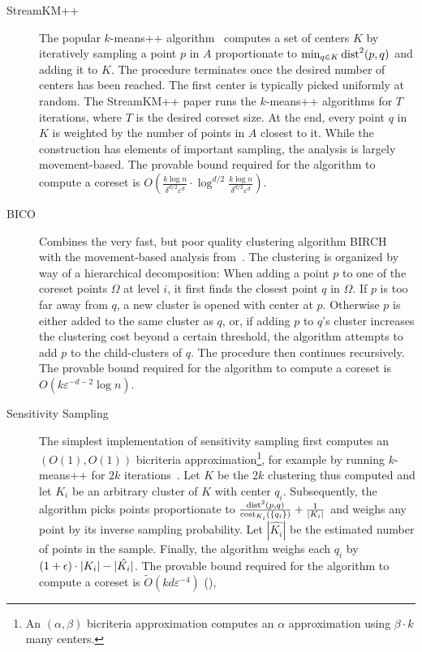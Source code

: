 \begin{description}
\item[StreamKM++~\cite{AckermannMRSLS12}] The popular $k$-means++ algorithm~\cite{ArV07} computes a set of centers $K$ by iteratively sampling a point $p$ in $A$ proportionate to $\min_{q\in K} \text{dist}^2(p,q)$ and adding it to $K$. The procedure terminates once the desired number of centers has been reached. The first center is typically picked uniformly at random.
The StreamKM++ paper runs the $k$-means++ algorithms for $T$ iterations, where $T$ is the desired coreset size. At the end, every point $q$ in $K$ is weighted by the number of points in $A$ closest to it. While the construction has elements of important sampling, the analysis is largely movement-based. The provable bound required for the algorithm to compute a coreset is $O\left(\frac{k\log n}{\delta^{d/2}\varepsilon^d}\cdot \log^{d/2} \frac{k\log n}{\delta^{d/2}\varepsilon^d}\right)$.
\item[BICO~\cite{FGSSS13}] Combines the very fast, but poor quality clustering algorithm BIRCH~\cite{ZRL97} with the movement-based analysis from~\cite{FrahlS2005,HaM04}. The clustering is organized by way of a hierarchical decomposition: When adding a point $p$ to one of the coreset points $\Omega$ at level $i$, it first finds the closest point $q$ in $\Omega$. If $p$ is too far away from $q$, a new cluster is opened with center at $p$. Otherwise $p$ is either added to the same cluster as $q$, or, if adding $p$ to $q$'s cluster increases the clustering cost beyond a certain threshold, the algorithm attempts to add $p$ to the child-clusters of $q$. The procedure then continues recursively. The provable bound required for the algorithm to compute a coreset is $O\left(k\varepsilon^{-d-2}\log n\right)$.
\item[Sensitivity Sampling~\cite{FL11}] The simplest implementation of sensitivity sampling first computes an $(O(1),O(1))$ bicriteria approximation\footnote{An $(\alpha,\beta)$ bicriteria approximation computes an $\alpha$ approximation using $\beta\cdot k$ many centers.}, for example by running $k$-means++ for $2k$ iterations~\cite{Wei16}. Let $K$ be the $2k$ clustering thus computed and let $K_i$ be an arbitrary cluster of $K$ with center $q_i$. Subsequently, the algorithm picks points proportionate to $\frac{\text{dist}^2(p,q)}{\text{cost}_{K_i}(\{q_i\})} + \frac{1}{|K_i|}$ and weighs any point by its inverse sampling probability. Let $|\hat{K_i}|$ be the estimated number of points in the sample. Finally, the algorithm weighs each $q_i$ by $(1+{\epsilon})\cdot |K_i| - |\hat{K_i}|$. The provable bound required for the algorithm to compute a coreset is $\tilde O\left(kd\varepsilon^{-4}\right)$ (\cite{FL11}),

\end{description}
